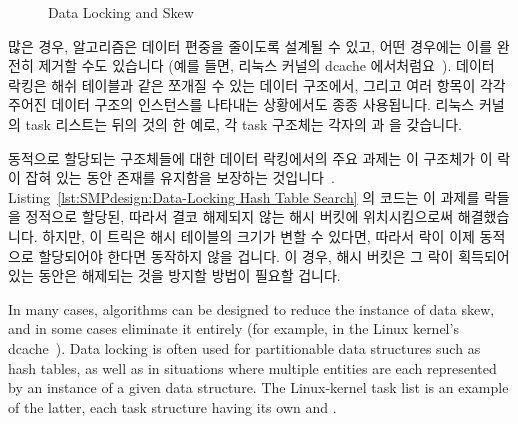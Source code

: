 \fi

\begin{figure}[tbh]
\centering
{}
\caption{Data Locking and Skew}
\end{figure}

많은 경우, 알고리즘은 데이터 편중을 줄이도록 설계될 수 있고, 어떤 경우에는 이를
완전히 제거할 수도 있습니다 (예를 들면, 리눅스 커널의 dcache
에서처럼요~\cite{McKenney04a,JonathanCorbet2010dcacheRCU,NeilBrown2015PathnameLookup,NeilBrown2015RCUwalk,NeilBrown2015PathnameSymlinks}).
데이터 락킹은 해쉬 테이블과 같은 쪼개질 수 있는 데이터 구조에서, 그리고 여러
항목이 각각 주어진 데이터 구조의 인스턴스를 나타내는 상황에서도 종종
사용됩니다.
리눅스 커널의 task 리스트는 뒤의 것의 한 예로, 각 task 구조체는 각자의
 과  을 갖습니다.

동적으로 할당되는 구조체들에 대한 데이터 락킹에서의 주요 과제는 이 구조체가 이
락이 잡혀 있는 동안 존재를 유지함을 보장하는 것입니다~\cite{Gamsa99}.
Listing~\ref{lst:SMPdesign:Data-Locking Hash Table Search}
의 코드는 이 과제를 락들을 정적으로 할당된, 따라서 결코 해제되지 않는 해시
버킷에 위치시킴으로써 해결했습니다.
하지만, 이 트릭은 해시 테이블의 크기가 변할 수 있다면, 따라서 락이 이제
동적으로 할당되어야 한다면 동작하지 않을 겁니다.
이 경우, 해시 버킷은 그 락이 획득되어 있는 동안은 해제되는 것을 방지할 방법이
필요할 겁니다.

\iffalse

In many cases, algorithms can be designed to reduce the instance of
data skew, and in some cases eliminate it entirely
(for example, in the Linux kernel's
dcache~\cite{McKenney04a,JonathanCorbet2010dcacheRCU,NeilBrown2015PathnameLookup,NeilBrown2015RCUwalk,NeilBrown2015PathnameSymlinks}).
Data locking is often used for partitionable data structures such as
hash tables, as well as in situations where multiple entities are each
represented by an instance of a given data structure.
The Linux-kernel task list is an example of the latter, each task
structure having its own  and .

